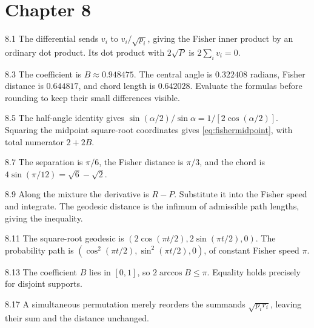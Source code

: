 \documentclass[11pt,oneside,openany]{book}
\theoremstyle{definition}
\theoremstyle{remark}
\newenvironment{answers}{\begin{description}[leftmargin=2.9em,labelwidth=2.5em,labelsep=.4em,itemsep=8pt,font=\normalfont\bfseries]}{\end{description}}
\numberwithin{equation}{chapter}
\begin{document}
\section*{Chapter 8}
\begin{answers}
\item[8.1] The differential sends $v_i$ to $v_i/\sqrt{p_i}$, giving the Fisher inner product by an ordinary dot product. Its dot product with $2\sqrt P$ is $2\sum_i v_i=0$.
\item[8.3] The coefficient is $B\approx0.948475$. The central angle is $0.322408$ radians, Fisher distance is $0.644817$, and chord length is $0.642028$. Evaluate the formulas before rounding to keep their small differences visible.
\item[8.5] The half-angle identity gives $\sin(\alpha/2)/\sin\alpha=1/[2\cos(\alpha/2)]$. Squaring the midpoint square-root coordinates gives \eqref{eq:fishermidpoint}, with total numerator $2+2B$.
\item[8.7] The separation is $\pi/6$, the Fisher distance is $\pi/3$, and the chord is $4\sin(\pi/12)=\sqrt6-\sqrt2$.
\item[8.9] Along the mixture the derivative is $R-P$. Substitute it into the Fisher speed and integrate. The geodesic distance is the infimum of admissible path lengths, giving the inequality.
\item[8.11] The square-root geodesic is $(2\cos(\pi t/2),2\sin(\pi t/2),0)$. The probability path is $(\cos^2(\pi t/2),\sin^2(\pi t/2),0)$, of constant Fisher speed $\pi$.
\item[8.13] The coefficient $B$ lies in $[0,1]$, so $2\arccos B\leq\pi$. Equality holds precisely for disjoint supports.
\item[8.17] A simultaneous permutation merely reorders the summands $\sqrt{p_ir_i}$, leaving their sum and the distance unchanged.
\end{answers}
\end{document}
